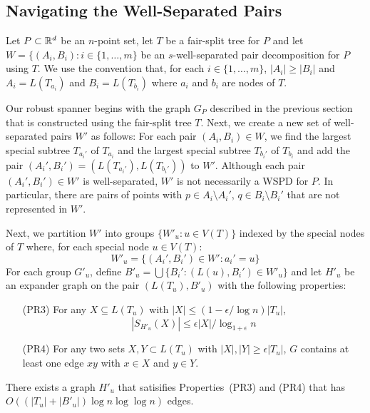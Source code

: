 \documentclass{patmorin}
\begin{document}
\subsection{Navigating the Well-Separated Pairs}

Let $P\subset\mathbb{R}^d$ be an $n$-point set, let $T$ be a fair-split tree for
$P$ and let $W=\{(A_i,B_i):i\in\{1,\ldots,m\}$ be an $s$-well-separated
pair decomposition for $P$ using $T$. We use the convention that,
for each $i\in\{1,\ldots,m\}$, $|A_i|\ge |B_i|$ and $A_i=L(T_{a_i})$
and $B_i=L(T_{b_i})$ where $a_i$ and $b_i$ are nodes of $T$.

Our robust spanner begins with the graph $G_P$ described in the previous
section that is constructed using the fair-split tree $T$.  Next,
we create a new set of well-separated pairs $W'$ as follows:  For each
pair $(A_i,B_i)\in W$, we find the largest special subtree $T_{a_i'}$
of $T_{a_i}$ and the largest special subtree $T_{b_i'}$ of $T_{b_i}$
and add the pair $(A_i',B_i')=(L(T_{a_i'}),L(T_{b_i'}))$ to $W'$.
Although each pair $(A_i',B_i')\in W'$ is well-separated, $W'$ is not
necessarily a WSPD for $P$.  In particular, there are pairs of points
with $p\in A_i\setminus A_i'$, $q\in B_i\setminus B_i'$ that are not
represented in $W'$.

Next, we partition $W'$ into groups $\{W'_u: u\in V(T)\}$ indexed by
the special nodes of $T$ where, for each special node $u\in V(T)$:
\[
	W'_u = \{ (A_i',B_i')\in W' : a_i' = u \}
\]
For each group $G'_u$, define $B'_u=\bigcup\{B_i' : (L(u),B_i')\in W'_u\}$
and let $H'_u$ be an expander graph on the pair $(L(T_u), B'_u)$ with
the following properties:
\begin{enumerate}
  \item[(PR3)] For any $X\subseteq L(T_u)$ with $|X|\le
  (1-\epsilon/\log n)|T_u|$, 
   \[ |S_{H'_u}(X)| \le \epsilon|X|/\log_{1+\epsilon} n \]
%
  \item[(PR4)] For any two sets $X,Y\subset L(T_u)$ with $|X|,|Y|\ge
  \epsilon|T_u|$, $G$ contains at least one edge $xy$ with $x\in X$
  and $y\in Y$.
\end{enumerate}

\begin{clm}
  There exists a graph $H'_u$ that satisifies Properties~(PR3) and (PR4)
  that has $O((|T_u|+|B'_u|)\log n\log\log n)$ edges.
\end{clm}
\end{document}

